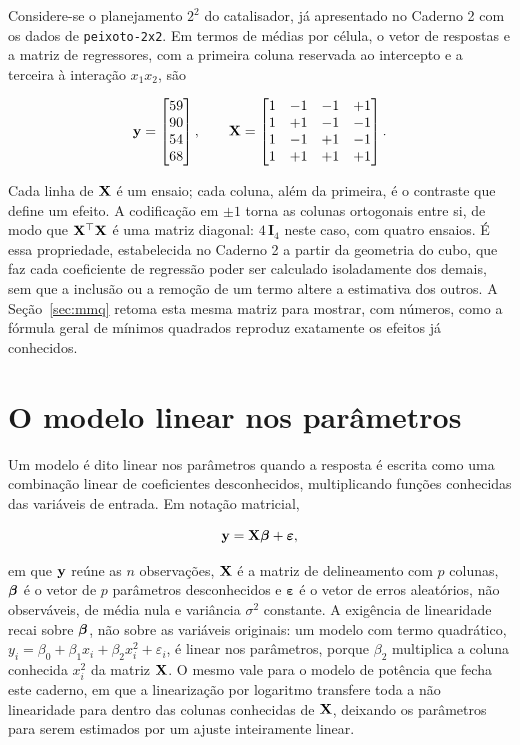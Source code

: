 \documentclass{doeapostila}
\newcommand{\vetepsilon}{\boldsymbol{\varepsilon}}
\begin{document}
Considere-se o planejamento $2^{2}$ do catalisador, já apresentado no
Caderno 2 com os dados de \texttt{peixoto-2x2}. Em termos de médias por
célula, o vetor de respostas e a matriz de regressores, com a primeira
coluna reservada ao intercepto e a terceira à interação $x_{1}x_{2}$, são

\begin{equation}
  \mathbf{y} = \begin{bmatrix} 59 \\ 90 \\ 54 \\ 68 \end{bmatrix},
  \qquad
  \mathbf{X} = \begin{bmatrix}
    1 & -1 & -1 & +1 \\
    1 & +1 & -1 & -1 \\
    1 & -1 & +1 & -1 \\
    1 & +1 & +1 & +1
  \end{bmatrix} .
  \label{eq:matriz-2x2}
\end{equation}

Cada linha de $\mathbf{X}$ é um ensaio; cada coluna, além da primeira, é o
contraste que define um efeito. A codificação em $\pm 1$ torna as colunas
ortogonais entre si, de modo que $\mathbf{X}^{\top}\mathbf{X}$ é uma matriz diagonal:
$4\,\mathbf{I}_4$ neste caso, com quatro ensaios. É essa propriedade,
estabelecida no Caderno 2 a partir da geometria do cubo, que faz cada
coeficiente de regressão poder ser calculado isoladamente dos demais, sem
que a inclusão ou a remoção de um termo altere a estimativa dos outros.
A Seção~\ref{sec:mmq} retoma esta mesma matriz para mostrar, com números,
como a fórmula geral de mínimos quadrados reproduz exatamente os efeitos
já conhecidos.

\section{O modelo linear nos parâmetros}

Um modelo é dito linear nos parâmetros quando a resposta é escrita como uma
combinação linear de coeficientes desconhecidos, multiplicando funções
conhecidas das variáveis de entrada. Em notação matricial,

\begin{equation}
  \vety = \matX\vetbeta + \vetepsilon ,
  \label{eq:modelo-geral}
\end{equation}

em que $\mathbf{y}$ reúne as $n$ observações, $\mathbf{X}$ é a matriz de
delineamento com $p$ colunas, $\boldsymbol{\beta}$ é o vetor de $p$ parâmetros
desconhecidos e $\vetepsilon$ é o vetor de erros aleatórios, não
observáveis, de média nula e variância $\sigma^{2}$ constante. A exigência
de linearidade recai sobre $\boldsymbol{\beta}$, não sobre as variáveis originais:
um modelo com termo quadrático, $y_i = \beta_0 + \beta_1 x_i + \beta_2
x_i^{2} + \varepsilon_i$, é linear nos parâmetros, porque $\beta_2$
multiplica a coluna conhecida $x_i^{2}$ da matriz $\mathbf{X}$. O mesmo vale
para o modelo de potência que fecha este caderno, em que a linearização
por logaritmo transfere toda a não linearidade para dentro das colunas
conhecidas de $\mathbf{X}$, deixando os parâmetros para serem estimados por um
ajuste inteiramente linear.
\end{document}
